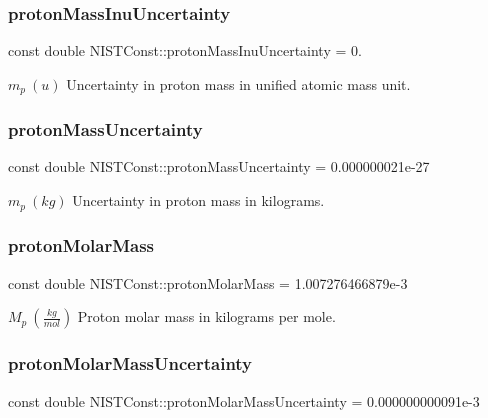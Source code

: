 \subsubsection{\texorpdfstring{proton\+Mass\+Inu\+Uncertainty}{protonMassInuUncertainty}}
{\footnotesize\ttfamily const double N\+I\+S\+T\+Const\+::proton\+Mass\+Inu\+Uncertainty = 0.}

$m_p \ (u)$ Uncertainty in proton mass in unified atomic mass unit. \mbox{\label{group___n_i_s_t_const-_proton_ga14f058f91a60fc3dff5e707b28b3f737}} 
\subsubsection{\texorpdfstring{proton\+Mass\+Uncertainty}{protonMassUncertainty}}
{\footnotesize\ttfamily const double N\+I\+S\+T\+Const\+::proton\+Mass\+Uncertainty = 0.\+000000021e-\/27}

$m_p \ (kg)$ Uncertainty in proton mass in kilograms. \mbox{\label{group___n_i_s_t_const-_proton_ga8a29760b90301104dbd9512674eccc4c}} 
\subsubsection{\texorpdfstring{proton\+Molar\+Mass}{protonMolarMass}}
{\footnotesize\ttfamily const double N\+I\+S\+T\+Const\+::proton\+Molar\+Mass = 1.\+007276466879e-\/3}

$M_p \ (\frac{kg}{mol})$ Proton molar mass in kilograms per mole. \mbox{\label{group___n_i_s_t_const-_proton_gaac054defc21692cb5ce9ed0508c44b42}} 
\subsubsection{\texorpdfstring{proton\+Molar\+Mass\+Uncertainty}{protonMolarMassUncertainty}}
{\footnotesize\ttfamily const double N\+I\+S\+T\+Const\+::proton\+Molar\+Mass\+Uncertainty = 0.\+000000000091e-\/3}

